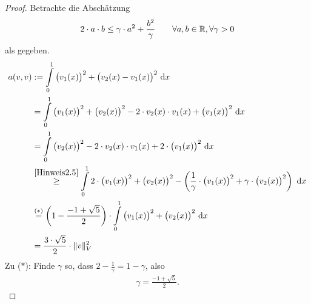 \documentclass[12pt,a4paper]{article}
\begin{document}
\begin{proof}
Betrachte die Abschätzung
\begin{align}\label{Hinweis2.5}
2\cdot a\cdot b\leq\gamma\cdot a^2+\frac{b^2}{\gamma}\qquad\forall a,b\in\mathbb{R},\forall\gamma>0
\end{align}
als gegeben.
\begin{align*}
a(v,v)&:=\int\limits_0^1 \big(v_1(x)\big)^2+\big(v_2(x)-v_1(x)\big)^2\text{ d} x\\
&=\int\limits_0^1 \big(v_1(x)\big)^2+\big(v_2(x)\big)^2-2\cdot v_2(x)\cdot v_1(x)+\big(v_1(x)\big)^2\text{ d} x\\
&=\int\limits_0^1 \big(v_2(x)\big)^2-2\cdot v_2(x)\cdot v_1(x)+2\cdot\big(v_1(x)\big)^2\text{ d} x\\
&\stackrel{\eqref{Hinweis2.5}}{\geq}
\int\limits_0^1 2\cdot\big(v_1(x)\big)^2+\big(v_2(x)\big)^2-\left(\frac{1}{\gamma}\cdot\big(v_1(x)\big)^2+\gamma\cdot\big(v_2(x)\big)^2\right)\text{ d} x\\
&\stackrel{(\ast)}{=}
\left(1-\frac{-1+\sqrt{5}}{2}\right)\cdot\int\limits_0^1 \big(v_1(x)\big)^2+\big(v_2(x)\big)^2\text{ d} x\\
&=\frac{3\cdot\sqrt{5}}{2}\cdot\Vert v\Vert^2_V
\end{align*}
Zu ($\ast$): Finde $\gamma$ so, dass $2-\frac{1}{\gamma}=1-\gamma$, also
\begin{align*}
\gamma=\frac{-1+\sqrt{5}}{2}.
\end{align*}
\end{proof}
\end{document}

